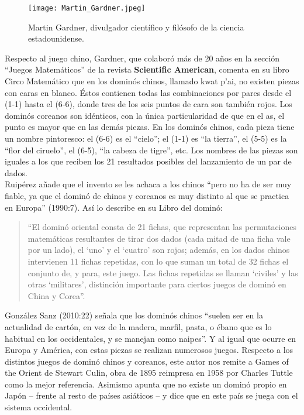 \begin{figure}[h]
  \begin{center}
    \texttt{[image: Martin\_Gardner.jpeg]}
  \end{center}
  \caption{Martin Gardner, divulgador científico y filósofo de la ciencia estadounidense.}
  \label{fig:Martin_Gardner}
\end{figure}


Respecto al juego chino, Gardner, que colaboró más de 20 años en la sección “Juegos Matemáticos” de
la revista \textbf{Scientific American}, comenta en su libro Circo Matemático que en los dominós chinos,
llamado kwat p’ai, no existen piezas con caras en blanco. Éstos contienen todas las combinaciones
por pares desde el (1-1)  hasta el (6-6), donde tres de los seis puntos de cara son también rojos.
Los dominós coreanos son idénticos, con la única particularidad de que en el as, el punto es mayor
que en las demás piezas. En los dominós chinos, cada pieza tiene un nombre pintoresco: el (6-6)
es el “cielo”; el (1-1) es “la tierra”, el (5-5) es la “flor del ciruelo”, el (6-5), “la cabeza de
tigre”, etc. Los nombres de las piezas son iguales a los que reciben los 21 resultados posibles del
lanzamiento de un par de dados. \\

Ruipérez añade que el invento se les achaca a los chinos “pero no ha de ser muy fiable, ya que el
dominó de chinos y coreanos es muy distinto al que se practica en Europa” (1990:7). Así lo describe
en su Libro del dominó:

\begin{quote}
“El dominó oriental consta de 21 fichas, que representan las permutaciones matemáticas resultantes
de tirar dos dados (cada mitad de una ficha vale por un lado), el ‘uno’ y el ‘cuatro’ son rojos;
además, en los dados chinos intervienen 11 fichas repetidas, con lo que suman un total de 32 fichas
el conjunto de, y para, este juego. Las fichas repetidas se llaman ‘civiles’ y las otras ‘militares’,
distinción importante para ciertos juegos de dominó en China y Corea”.
\end{quote}

González Sanz (2010:22) señala que los dominós chinos “suelen ser en la actualidad de cartón, en vez
de la madera, marfil, pasta, o ébano que es lo habitual en los occidentales, y se manejan como naipes”.
Y al igual que ocurre en Europa y América, con estas piezas se realizan numerosos juegos. Respecto a
los distintos juegos de dominó chinos y coreanos, este autor nos remite a Games of the Orient de Stewart
Culin, obra de 1895 reimpresa en 1958 por Charles Tuttle como la mejor referencia. Asimismo apunta que
no existe un dominó propio en Japón – frente al resto de países asiáticos – y dice que en este país se
juega con el sistema occidental. \\

